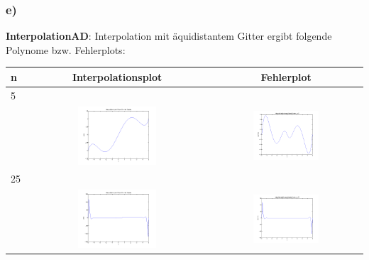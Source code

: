 \documentclass[11pt,a4paper,ngerman]{article}
\begin{document}
\newpage
\subsubsection*{e)}
\textbf{InterpolationAD}: Interpolation mit äquidistantem Gitter ergibt folgende Polynome bzw. Fehlerplots:

\begin{tabular}{l|cc}
n & Interpolationsplot & Fehlerplot \\
\hline
5 & & \\
 & \includegraphics[width=0.45\textwidth]{plotE_AD_5.png} & \includegraphics[width=0.45\textwidth]{fehlerAD_5.png} \\ 
25 & & \\
& \includegraphics[width=0.45\textwidth]{plotE_AD_25.png} & \includegraphics[width=0.45\textwidth]{fehlerAD_25.png} \\

\end{tabular}
\end{document}
